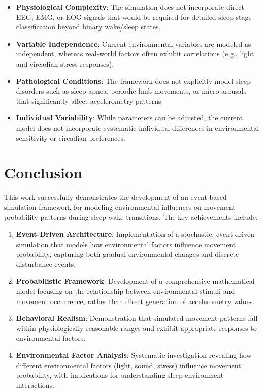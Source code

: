 \documentclass[conference]{IEEEtran}
\begin{document}
\begin{itemize}
	\item \textbf{Physiological Complexity}: The simulation does not incorporate direct EEG, EMG, or EOG signals that would be required for detailed sleep stage classification beyond binary wake/sleep states.

	\item \textbf{Variable Independence}: Current environmental variables are modeled as independent, whereas real-world factors often exhibit correlations (e.g., light and circadian stress responses).

	\item \textbf{Pathological Conditions}: The framework does not explicitly model sleep disorders such as sleep apnea, periodic limb movements, or micro-arousals that significantly affect accelerometry patterns.

	\item \textbf{Individual Variability}: While parameters can be adjusted, the current model does not incorporate systematic individual differences in environmental sensitivity or circadian preferences.
\end{itemize}

\section{Conclusion}

This work successfully demonstrates the development of an event-based simulation framework for modeling environmental influences on movement probability patterns during sleep-wake transitions. The key achievements include:

\begin{enumerate}
	\item \textbf{Event-Driven Architecture}: Implementation of a stochastic, event-driven simulation that models how environmental factors influence movement probability, capturing both gradual environmental changes and discrete disturbance events.

	\item \textbf{Probabilistic Framework}: Development of a comprehensive mathematical model focusing on the relationship between environmental stimuli and movement occurrence, rather than direct generation of accelerometry values.

	\item \textbf{Behavioral Realism}: Demonstration that simulated movement patterns fall within physiologically reasonable ranges and exhibit appropriate responses to environmental factors.

	\item \textbf{Environmental Factor Analysis}: Systematic investigation revealing how different environmental factors (light, sound, stress) influence movement probability, with implications for understanding sleep-environment interactions.
\end{enumerate}
\end{document}
